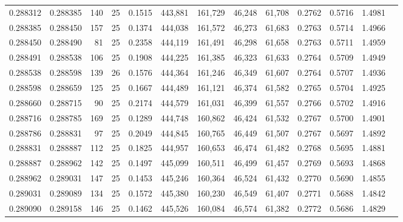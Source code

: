 \begin{tabular}{rrrrrrrrrrrrr}
0.288312 & 0.288385 &   140 &  25 &                                     0.1515 & 443,881 & 161,729 &  46,248 &  61,708 & 0.2762 & 0.5716 & 1.4981 \\
0.288385 & 0.288450 &   157 &  25 &                                     0.1374 & 444,038 & 161,572 &  46,273 &  61,683 & 0.2763 & 0.5714 & 1.4966 \\
0.288450 & 0.288490 &    81 &  25 &                                     0.2358 & 444,119 & 161,491 &  46,298 &  61,658 & 0.2763 & 0.5711 & 1.4959 \\
0.288491 & 0.288538 &   106 &  25 &                                     0.1908 & 444,225 & 161,385 &  46,323 &  61,633 & 0.2764 & 0.5709 & 1.4949 \\
0.288538 & 0.288598 &   139 &  26 &                                     0.1576 & 444,364 & 161,246 &  46,349 &  61,607 & 0.2764 & 0.5707 & 1.4936 \\
0.288598 & 0.288659 &   125 &  25 &                                     0.1667 & 444,489 & 161,121 &  46,374 &  61,582 & 0.2765 & 0.5704 & 1.4925 \\
0.288660 & 0.288715 &    90 &  25 &                                     0.2174 & 444,579 & 161,031 &  46,399 &  61,557 & 0.2766 & 0.5702 & 1.4916 \\
0.288716 & 0.288785 &   169 &  25 &                                     0.1289 & 444,748 & 160,862 &  46,424 &  61,532 & 0.2767 & 0.5700 & 1.4901 \\
0.288786 & 0.288831 &    97 &  25 &                                     0.2049 & 444,845 & 160,765 &  46,449 &  61,507 & 0.2767 & 0.5697 & 1.4892 \\
0.288831 & 0.288887 &   112 &  25 &                                     0.1825 & 444,957 & 160,653 &  46,474 &  61,482 & 0.2768 & 0.5695 & 1.4881 \\
0.288887 & 0.288962 &   142 &  25 &                                     0.1497 & 445,099 & 160,511 &  46,499 &  61,457 & 0.2769 & 0.5693 & 1.4868 \\
0.288962 & 0.289031 &   147 &  25 &                                     0.1453 & 445,246 & 160,364 &  46,524 &  61,432 & 0.2770 & 0.5690 & 1.4855 \\
0.289031 & 0.289089 &   134 &  25 &                                     0.1572 & 445,380 & 160,230 &  46,549 &  61,407 & 0.2771 & 0.5688 & 1.4842 \\
0.289090 & 0.289158 &   146 &  25 &                                     0.1462 & 445,526 & 160,084 &  46,574 &  61,382 & 0.2772 & 0.5686 & 1.4829 \\

\end{tabular}
